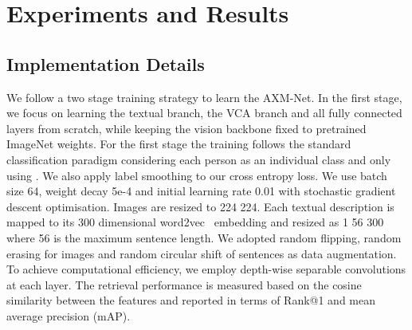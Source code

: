 \documentclass[10pt,twocolumn,letterpaper]{article}
\begin{document}
\section{Experiments and Results}
\subsection{Implementation Details}
We follow a two stage training strategy to learn the AXM-Net. In the first stage, we focus on learning the textual branch, the VCA branch and all fully connected layers from scratch, while keeping the vision backbone fixed to pretrained ImageNet weights. For the first stage the training follows the standard classification paradigm considering each person as an individual class and only using . We also apply label smoothing to our cross entropy loss. We use batch size 64, weight decay 5e-4 and initial learning rate 0.01 with stochastic gradient descent optimisation. Images are resized to 224  224. Each textual description is mapped to its 300 dimensional word2vec~\cite{mikolov2013distributed} embedding and resized as 1  56  300 where 56 is the maximum sentence length. We adopted random flipping, random erasing for images and random circular shift of sentences as data augmentation. To achieve computational efficiency, we employ depth-wise separable convolutions at each layer. The retrieval performance is measured based on the cosine similarity between the features and reported in terms of Rank@1 and mean average precision ({m}AP).
\end{document}
